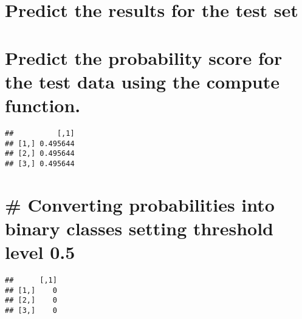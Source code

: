 \documentclass[
]{article}
\newenvironment{Shaded}{\begin{snugshade}}{\end{snugshade}}
\newcommand{\CommentTok}[1]{\textcolor[rgb]{0.56,0.35,0.01}{\textit{#1}}}
\newcommand{\DecValTok}[1]{\textcolor[rgb]{0.00,0.00,0.81}{#1}}
\newcommand{\FloatTok}[1]{\textcolor[rgb]{0.00,0.00,0.81}{#1}}
\newcommand{\KeywordTok}[1]{\textcolor[rgb]{0.13,0.29,0.53}{\textbf{#1}}}
\newcommand{\NormalTok}[1]{#1}
\newcommand{\OperatorTok}[1]{\textcolor[rgb]{0.81,0.36,0.00}{\textbf{#1}}}
\newcommand{\StringTok}[1]{\textcolor[rgb]{0.31,0.60,0.02}{#1}}
\begin{document}
\hypertarget{predict-the-results-for-the-test-set}{%
\section{Predict the results for the test
set}\label{predict-the-results-for-the-test-set}}

\hypertarget{predict-the-probability-score-for-the-test-data-using-the-compute-function.}{%
\section{Predict the probability score for the test data using the
compute
function.}\label{predict-the-probability-score-for-the-test-data-using-the-compute-function.}}

\begin{Shaded}
\end{Shaded}

\begin{verbatim}
##          [,1]
## [1,] 0.495644
## [2,] 0.495644
## [3,] 0.495644
\end{verbatim}

\hypertarget{converting-probabilities-into-binary-classes-setting-threshold-level-0.5}{%
\section{\# Converting probabilities into binary classes setting
threshold level
0.5}\label{converting-probabilities-into-binary-classes-setting-threshold-level-0.5}}

\begin{Shaded}
\end{Shaded}

\begin{verbatim}
##      [,1]
## [1,]    0
## [2,]    0
## [3,]    0
\end{verbatim}
\end{document}
